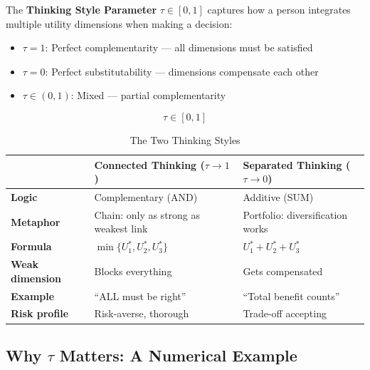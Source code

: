 \begin{definition}
\label{def:tau}
The \textbf{Thinking Style Parameter} $\tau \in [0,1]$ captures how a person 
integrates multiple utility dimensions when making a decision:
\begin{itemize}
\item $\tau = 1$: Perfect complementarity — all dimensions must be satisfied
\item $\tau = 0$: Perfect substitutability — dimensions compensate each other
\item $\tau \in (0,1)$: Mixed — partial complementarity
\end{itemize}
\end{definition}

\begin{equation}
\boxed{\tau \in [0, 1]}
\end{equation}

\begin{table}[htbp]
\centering
\caption{The Two Thinking Styles}
\label{tab:thinking-styles}
\begin{tabular}{lp{5.5cm}p{5.5cm}}
\toprule
& \textbf{Connected Thinking} ($\tau \to 1$) & \textbf{Separated Thinking} ($\tau \to 0$) \\
\midrule
\textbf{Logic} & Complementary (AND) & Additive (SUM) \\[4pt]
\textbf{Metaphor} & Chain: only as strong as weakest link & Portfolio: diversification works \\[4pt]
\textbf{Formula} & $\min\{U_1^*, U_2^*, U_3^*\}$ & $U_1^* + U_2^* + U_3^*$ \\[4pt]
\textbf{Weak dimension} & Blocks everything & Gets compensated \\[4pt]
\textbf{Example} & ``ALL must be right'' & ``Total benefit counts'' \\[4pt]
\textbf{Risk profile} & Risk-averse, thorough & Trade-off accepting \\
\bottomrule
\end{tabular}
\end{table}

\subsection{Why $\tau$ Matters: A Numerical Example}
\label{subsec:12-2-why-matters}

